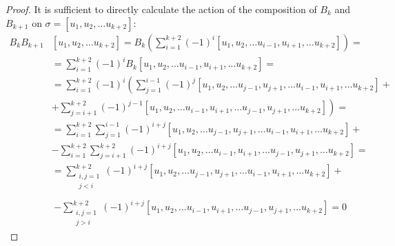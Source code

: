 
\begin{proof}
      It is sufficient to directly calculate the action of the composition of \(B_k\) and \( B_{k+1}\) on \(\sigma = [u_1, u_2, \dots u_{k+2}]\):
      \begin{equation}
            \begin{aligned}
                  B_k B_{k+1} & [ u_1, u_2, \dots u_{k+2} ]  = B_k \left( \sum_{i=1}^{k+2} \left( -1 \right)^i [u_1, u_2, \dots u_{i-1}, u_{i+1}, \dots u_{k+2} ] \right) = \\
                  & =  \sum_{i=1}^{k+2} \left( -1 \right)^i B_k [u_1, u_2, \dots u_{i-1}, u_{i+1}, \dots u_{k+2}] = \\
                  & = \sum_{i=1}^{k+2} \left( -1 \right)^i \left( 
                  \sum_{j=1}^{i-1} (-1)^j [u_1, u_2, \dots u_{j-1}, u_{j+1}, \dots u_{i-1}, u_{i+1}, \dots u_{k+2}] + \right. \\
                  & \left. + \sum_{j=i+1}^{k+2} (-1)^{j-1} [u_1, u_2, \dots u_{i-1}, u_{i+1}, \dots u_{j-1}, u_{j+1}, \dots u_{k+2}] 
                  \right) =  \\
                  & = \sum_{i=1}^{k+2}
                  \sum_{j=1}^{i-1} (-1)^{i+j} [u_1, u_2, \dots u_{j-1}, u_{j+1}, \dots u_{i-1}, u_{i+1}, \dots u_{k+2}] + \\
                  &  - \sum_{i=1}^{k+2}\sum_{j=i+1}^{k+2} (-1)^{i+j} [u_1, u_2, \dots u_{i-1}, u_{i+1}, \dots u_{j-1}, u_{j+1}, \dots u_{k+2}] 
                   = \\
                   & = \sum_{\substack{i, j = 1\\ j<i}}^{k+2}
                  (-1)^{i+j} [u_1, u_2, \dots u_{j-1}, u_{j+1}, \dots u_{i-1}, u_{i+1}, \dots u_{k+2}] + \\
            \end{aligned}
      \end{equation}
      \begin{equation}
            \begin{aligned}
                  \phantom{B_k B_{k+1}}
                  &  - \sum_{\substack{i, j =1 \\ j>i}}^{k+2} (-1)^{i+j} [u_1, u_2, \dots u_{i-1}, u_{i+1}, \dots u_{j-1}, u_{j+1}, \dots u_{k+2}] 
                   = 0
            \end{aligned}
      \end{equation}
\end{proof}

